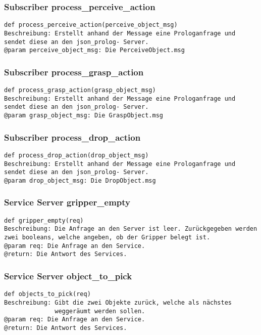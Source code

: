 \documentclass{suturo}
\begin{document}
\subsubsection{Subscriber process\_perceive\_action}
\begin{verbatim}
def process_perceive_action(perceive_object_msg)
Beschreibung: Erstellt anhand der Message eine Prologanfrage und
sendet diese an den json_prolog- Server. 
@param perceive_object_msg: Die PerceiveObject.msg
\end{verbatim}

\subsubsection{Subscriber process\_grasp\_action}
\begin{verbatim}
def process_grasp_action(grasp_object_msg)
Beschreibung: Erstellt anhand der Message eine Prologanfrage und
sendet diese an den json_prolog- Server. 
@param grasp_object_msg: Die GraspObject.msg
\end{verbatim}

\subsubsection{Subscriber process\_drop\_action}
\begin{verbatim}
def process_drop_action(drop_object_msg)
Beschreibung: Erstellt anhand der Message eine Prologanfrage und
sendet diese an den json_prolog- Server. 
@param drop_object_msg: Die DropObject.msg
\end{verbatim}

\subsubsection{Service Server gripper\_empty}
\begin{verbatim}
def gripper_empty(req)
Beschreibung: Die Anfrage an den Server ist leer. Zurückgegeben werden
zwei booleans, welche angeben, ob der Gripper belegt ist.
@param req: Die Anfrage an den Service.
@return: Die Antwort des Services.
\end{verbatim}

\subsubsection{Service Server object\_to\_pick}
\begin{verbatim}
def objects_to_pick(req)
Beschreibung: Gibt die zwei Objekte zurück, welche als nächstes 
              weggeräumt werden sollen.
@param req: Die Anfrage an den Service.
@return: Die Antwort des Services.
\end{verbatim}
\end{document}
